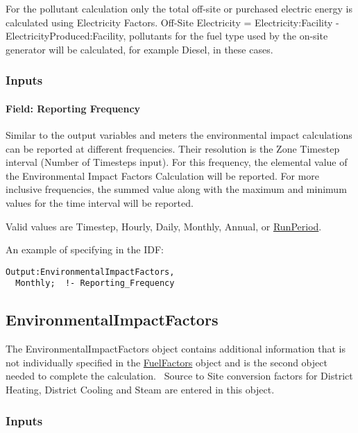 For the pollutant calculation only the total off-site or purchased electric energy is calculated using Electricity Factors. Off-Site Electricity = Electricity:Facility - ElectricityProduced:Facility, pollutants for the fuel type used by the on-site generator will be calculated, for example Diesel, in these cases.

\subsubsection{Inputs}\label{inputs-9-017}

\paragraph{Field: Reporting Frequency}\label{field-reporting-frequency-2}

Similar to the output variables and meters the environmental impact calculations can be reported at different frequencies. Their resolution is the Zone Timestep interval (Number of Timesteps input). For this frequency, the elemental value of the Environmental Impact Factors Calculation will be reported. For more inclusive frequencies, the summed value along with the maximum and minimum values for the time interval will be reported.

Valid values are Timestep, Hourly, Daily, Monthly, Annual, or \hyperref[runperiod]{RunPeriod}.

An example of specifying in the IDF:

\begin{lstlisting}
Output:EnvironmentalImpactFactors,
  Monthly;  !- Reporting_Frequency
\end{lstlisting}

\subsection{EnvironmentalImpactFactors}\label{environmentalimpactfactors}

The EnvironmentalImpactFactors object contains additional information that is not individually specified in the \hyperref[fuelfactors]{FuelFactors} object and is the second object needed to complete the calculation.~ Source to Site conversion factors for District Heating, District Cooling and Steam are entered in this object.

\subsubsection{Inputs}\label{inputs-10-017}

